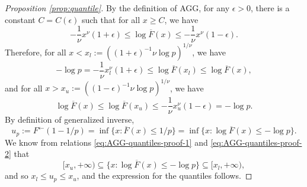% 
\begin{proof}[Proposition \ref{prop:quantile}]
By the definition of AGG, for any $\epsilon>0$, there is a constant $C=C(\epsilon)$ such that for all $x\ge C$, we have
$$
-\frac{1}{\nu}x^\nu(1+\epsilon) \le \log{\overline{F}(x)} \le -\frac{1}{\nu}x^\nu(1-\epsilon).
$$
Therefore, for all $x < x_l := \left((1+\epsilon)^{-1}\nu\log{p}\right)^{1/\nu}$, we have
\begin{equation} \label{eq:AGG-quantiles-proof-1}
    -\log{p} = -\frac{1}{\nu}x_l^\nu(1+\epsilon) \le \log{\overline{F}(x_l)} \le \log{\overline{F}(x)},
\end{equation}
and for all $x > x_u := \left((1-\epsilon)^{-1}\nu\log{p}\right)^{1/\nu}$, we have
\begin{equation} \label{eq:AGG-quantiles-proof-2}
    \log{\overline{F}(x)} \le \log{\overline{F}(x_u)} \le -\frac{1}{\nu}x_u^\nu(1-\epsilon) = -\log{p}.
\end{equation}
By definition of generalized inverse,
\begin{equation*}
    u_p := F^\leftarrow(1-1/p) = \inf\{x:\overline{F}(x)\le 1/p\} = \inf\{x:\log{\overline{F}(x)} \le -\log{p}\}.
\end{equation*}
We know from relations \eqref{eq:AGG-quantiles-proof-1} and \eqref{eq:AGG-quantiles-proof-2} that 
$$
[x_u, +\infty) \subseteq \{x:\log{\overline{F}(x)} \le -\log{p}\} \subseteq [x_l, +\infty),
$$
and so $x_l\le u_p \le x_u$, and the expression for the quantiles follows.
\end{proof}

